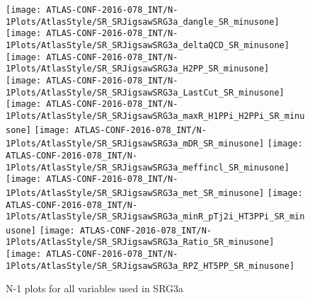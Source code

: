 \clearpage
\begin{figure}[tbp]
\begin{center}
\texttt{[image: ATLAS-CONF-2016-078\_INT/N-1Plots/AtlasStyle/SR\_SRJigsawSRG3a\_dangle\_SR\_minusone]}
\texttt{[image: ATLAS-CONF-2016-078\_INT/N-1Plots/AtlasStyle/SR\_SRJigsawSRG3a\_deltaQCD\_SR\_minusone]}
\texttt{[image: ATLAS-CONF-2016-078\_INT/N-1Plots/AtlasStyle/SR\_SRJigsawSRG3a\_H2PP\_SR\_minusone]}
\texttt{[image: ATLAS-CONF-2016-078\_INT/N-1Plots/AtlasStyle/SR\_SRJigsawSRG3a\_LastCut\_SR\_minusone]}
\texttt{[image: ATLAS-CONF-2016-078\_INT/N-1Plots/AtlasStyle/SR\_SRJigsawSRG3a\_maxR\_H1PPi\_H2PPi\_SR\_minusone]}
\texttt{[image: ATLAS-CONF-2016-078\_INT/N-1Plots/AtlasStyle/SR\_SRJigsawSRG3a\_mDR\_SR\_minusone]}
\texttt{[image: ATLAS-CONF-2016-078\_INT/N-1Plots/AtlasStyle/SR\_SRJigsawSRG3a\_meffincl\_SR\_minusone]}
\texttt{[image: ATLAS-CONF-2016-078\_INT/N-1Plots/AtlasStyle/SR\_SRJigsawSRG3a\_met\_SR\_minusone]}
\texttt{[image: ATLAS-CONF-2016-078\_INT/N-1Plots/AtlasStyle/SR\_SRJigsawSRG3a\_minR\_pTj2i\_HT3PPi\_SR\_minusone]}
\texttt{[image: ATLAS-CONF-2016-078\_INT/N-1Plots/AtlasStyle/SR\_SRJigsawSRG3a\_Ratio\_SR\_minusone]}
\texttt{[image: ATLAS-CONF-2016-078\_INT/N-1Plots/AtlasStyle/SR\_SRJigsawSRG3a\_RPZ\_HT5PP\_SR\_minusone]}
\end{center}
\caption{N-1 plots for all variables used in SRG3a}
\label{fig:SR_SRJigsawSRG2b_met_SR_minusone}
\end{figure}


